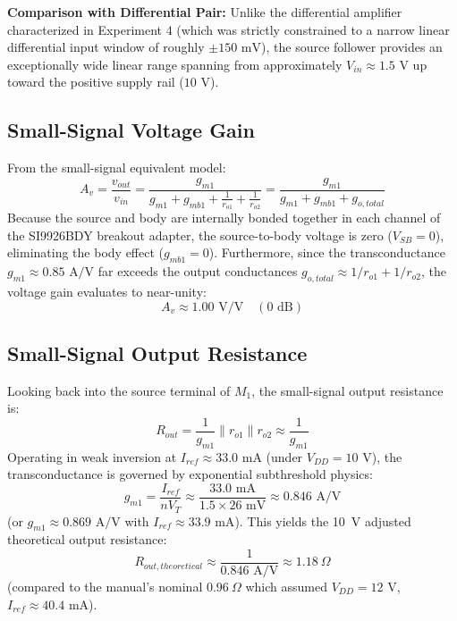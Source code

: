 \documentclass[11pt, a4paper]{article}
\begin{document}
\noindent\textbf{Comparison with Differential Pair:} Unlike the differential amplifier characterized in Experiment 4 (which was strictly constrained to a narrow linear differential input window of roughly $\pm 150\text{ mV}$), the source follower provides an exceptionally wide linear range spanning from approximately $V_{in} \approx 1.5\text{ V}$ up toward the positive supply rail ($10\text{ V}$).

\subsection{Small-Signal Voltage Gain}
From the small-signal equivalent model:
\begin{equation}
A_v = \frac{v_{out}}{v_{in}} = \frac{g_{m1}}{g_{m1} + g_{mb1} + \frac{1}{r_{o1}} + \frac{1}{r_{o2}}} = \frac{g_{m1}}{g_{m1} + g_{mb1} + g_{o,total}}
\end{equation}
Because the source and body are internally bonded together in each channel of the SI9926BDY breakout adapter, the source-to-body voltage is zero ($V_{SB} = 0$), eliminating the body effect ($g_{mb1} = 0$). Furthermore, since the transconductance $g_{m1} \approx 0.85\text{ A/V}$ far exceeds the output conductances $g_{o,total} \approx 1/r_{o1} + 1/r_{o2}$, the voltage gain evaluates to near-unity:
\begin{equation}
A_v \approx 1.00\text{ V/V} \quad (0\text{ dB})
\end{equation}

\subsection{Small-Signal Output Resistance}
Looking back into the source terminal of $M_1$, the small-signal output resistance is:
\begin{equation}
R_{out} = \frac{1}{g_{m1}} \parallel r_{o1} \parallel r_{o2} \approx \frac{1}{g_{m1}}
\end{equation}
Operating in weak inversion at $I_{ref} \approx 33.0\text{ mA}$ (under $V_{DD} = 10\text{ V}$), the transconductance is governed by exponential subthreshold physics:
\begin{equation}
g_{m1} = \frac{I_{ref}}{n V_T} \approx \frac{33.0\text{ mA}}{1.5 \times 26\text{ mV}} \approx 0.846\text{ A/V}
\end{equation}
(or $g_{m1} \approx 0.869\text{ A/V}$ with $I_{ref} \approx 33.9\text{ mA}$). This yields the 10~V adjusted theoretical output resistance:
\begin{equation}
R_{out, theoretical} \approx \frac{1}{0.846\text{ A/V}} \approx 1.18\ \Omega
\end{equation}
(compared to the manual's nominal $0.96\ \Omega$ which assumed $V_{DD} = 12\text{ V}$, $I_{ref} \approx 40.4\text{ mA}$).
\end{document}
